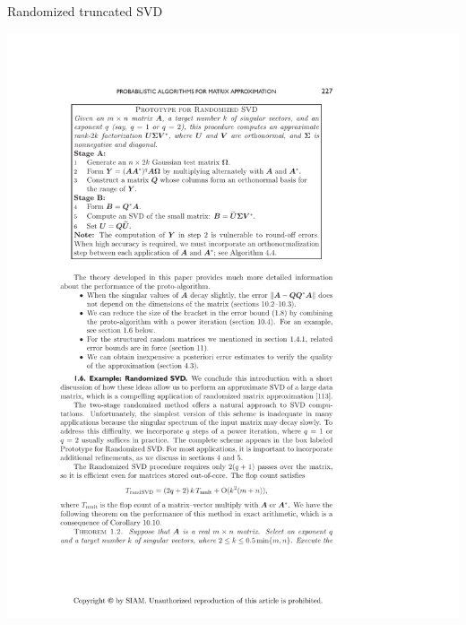 
\begin{frame}[fragile]
\fontsize{8pt}{10}\selectfont
\begin{block}{Randomized truncated SVD\footnotemark}
  \begin{minipage}{.56\textwidth}
    \begin{center}
      \includegraphics[height=.41\textheight]{../common/pics/randsvd/randSVDalg}
      \\

\end{center}
\end{minipage}
\end{block}
\end{frame}

